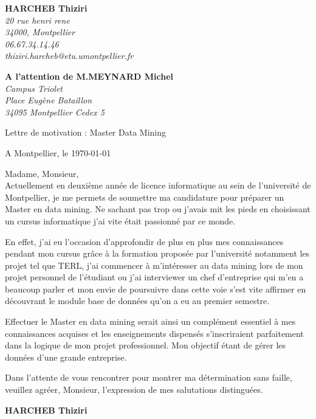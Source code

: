 \documentclass[11pt]{letter}
\begin{document}
 \sffamily
 \hfill
 \begin{flushleft}
 {\bfseries HARCHEB Thiziri}\\[.35ex]
 \small\itshape
 20 rue henri rene\\
 34000, Montpellier\\[.35ex]
 06.67.34.14.46\\
 thiziri.harcheb@etu.umontpellier.fr
 \end{flushleft}
 \begin{flushright}
 {\bfseries A l'attention de M.MEYNARD Michel}\\[.35ex]
 \small\itshape
 Campus Triolet\\
Place Eugène Bataillon\\
34095 Montpellier Cedex 5\\
 \end{flushright}
 
 \begin{center}
 Lettre de motivation : Master Data Mining\\
 \end{center}
 
 \begin{flushright}
 A Montpellier, le \today \\
 \end{flushright}
 Madame, Monsieur,\\
 
    Actuellement en deuxième année de licence informatique au sein de  l’université de Montpellier,
je me permets de soumettre ma candidature pour préparer un Master en data mining.
  Ne sachant pas trop ou j’avais mit les pieds en choisissant un cursus informatique j’ai vite
était passionné par ce monde.

En effet, j’ai eu l’occasion d’approfondir de plus en plus mes connaissances pendant mon cursus
grâce à la formation proposée par l’université notamment les projet tel que TERL, j’ai commencer à
m’intéresser au data mining lors de mon projet personnel de l’étudiant ou j’ai interviewer un chef
d’entreprise qui m’en a beaucoup parler et mon envie de poursuivre dans cette voie s’est vite
affirmer en découvrant le module base de données qu’on a eu au premier semestre.


    Effectuer le Master en data mining serait ainsi un complément essentiel à mes connaissances
acquises et les enseignements dispensés s’inscriraient parfaitement dans la logique de mon
projet professionnel. Mon objectif étant de gérer les données d’une grande entreprise. 

    Dans l’attente de vous rencontrer pour montrer ma détermination sans faille, veuillez agréer,
  Monsieur, l’expression de mes salutations distinguées.

 \begin{center}
 {\bfseries HARCHEB Thiziri}\\
 \end{center}
 \vfill
 
\end{document}
